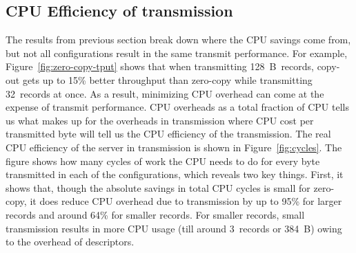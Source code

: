 \subsection {CPU Efficiency of transmission}
The results from previous section break down where the CPU savings come from,
but not all configurations result in the same transmit performance. For
example, Figure~\ref{fig:zero-copy-tput} shows that when transmitting
128~B~records, copy-out gets up to 15\% better throughput than zero-copy while transmitting
32~records at once. As a result, minimizing CPU overhead can come at the expense of transmit
performance. CPU overheads as a total fraction of CPU tells us what makes up for the overheads 
in transmission where CPU cost per transmitted byte will tell us the CPU efficiency of the 
transmission. The real CPU efficiency of the server in transmission is shown in
Figure~\ref{fig:cycles}. The figure shows how many cycles of work the CPU needs to do
for every byte transmitted in each of the configurations, which reveals two key things.
First, it shows that, though the absolute savings in total CPU cycles is small
for zero-copy, it does reduce CPU overhead due to transmission by up to 95\% for 
larger records and around 64\% for smaller records. For smaller records, small transmission
results in more CPU usage (till around 3~records or 384~B) owing to the overhead of descriptors.




%

%


